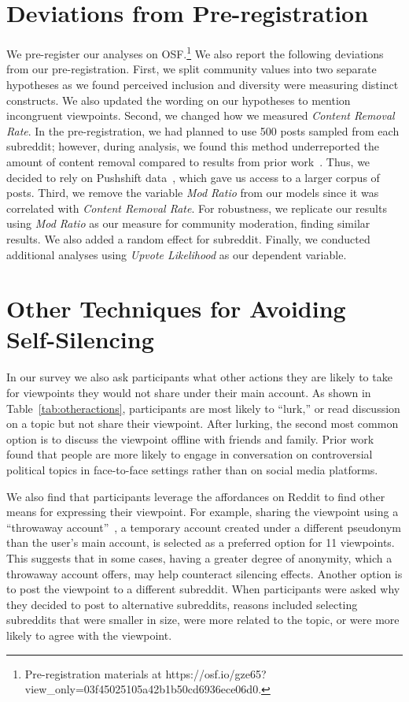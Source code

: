\section{Deviations from Pre-registration}
We pre-register our analyses on OSF.\footnote{Pre-registration materials at https://osf.io/gze65?view\_only=03f45025105a42b1b50cd6936ece06d0.} We also report the following deviations from our pre-registration. First, we split community values into two separate hypotheses as we found perceived inclusion and diversity were measuring distinct constructs. We also updated the wording on our hypotheses to mention incongruent viewpoints. Second, we changed how we measured \textit{Content Removal Rate}. In the pre-registration, we had planned to use 500 posts sampled from each subreddit; however, during analysis, we found this method underreported the amount of content removal compared to results from prior work~\cite{jhaver2019does}. Thus, we decided to rely on Pushshift data~\cite{pushshift2023dumps}, which gave us access to a larger corpus of posts. Third, we remove the variable \textit{Mod Ratio} from our models since it was correlated with \textit{Content Removal Rate}. For robustness, we replicate our results using \textit{Mod Ratio} as our measure for community moderation, finding similar results. We also added a random effect for subreddit. Finally, we conducted additional analyses using \textit{Upvote Likelihood} as our dependent variable.


\section{Other Techniques for Avoiding Self-Silencing}
In our survey we also ask participants what other actions they are likely to take for viewpoints they would not share under their main account. As shown in Table~\ref{tab:otheractions}, participants are most likely to ``lurk,'' or read discussion on a topic but not share their viewpoint. After lurking, the second most common option is to discuss the viewpoint offline with friends and family. Prior work~\cite{pewresearchcenter_2014_sos} found that people are more likely to engage in conversation on controversial political topics in face-to-face settings rather than on social media platforms. 

We also find that participants leverage the affordances on Reddit to find other means for expressing their viewpoint. For example, sharing the viewpoint using a ``throwaway account''~\cite{leavitt2015throwaway}, a temporary account created under a different pseudonym than the user's main account, is selected as a preferred option for 11 viewpoints. This suggests that in some cases, having a greater degree of anonymity, which a throwaway account offers, may help counteract silencing effects. Another option is to post the viewpoint to a different subreddit. When participants were asked why they decided to post to alternative subreddits, reasons included selecting subreddits that were smaller in size, were more related to the topic, or were more likely to agree with the viewpoint. 


